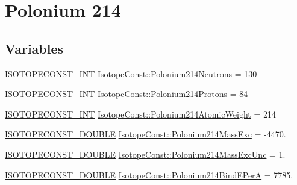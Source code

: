 \hypertarget{group___isotope_const-_polonium-_po214}{}\section{Polonium 214}
\label{group___isotope_const-_polonium-_po214}
\subsection*{Variables}
\begin{DoxyCompactItemize}
\item 
\mbox{\hyperlink{group___isotope_const-_macros_ga5f18360b3e99483a35c32d789e62621c}{I\+S\+O\+T\+O\+P\+E\+C\+O\+N\+S\+T\+\_\+\+I\+NT}} \mbox{\hyperlink{group___isotope_const-_polonium-_po214_ga50bfaf605987fdd560646bcad4c8de04}{Isotope\+Const\+::\+Polonium214\+Neutrons}} = 130
\item 
\mbox{\hyperlink{group___isotope_const-_macros_ga5f18360b3e99483a35c32d789e62621c}{I\+S\+O\+T\+O\+P\+E\+C\+O\+N\+S\+T\+\_\+\+I\+NT}} \mbox{\hyperlink{group___isotope_const-_polonium-_po214_ga3c983859eb45c649ed7a60fcacbdc90e}{Isotope\+Const\+::\+Polonium214\+Protons}} = 84
\item 
\mbox{\hyperlink{group___isotope_const-_macros_ga5f18360b3e99483a35c32d789e62621c}{I\+S\+O\+T\+O\+P\+E\+C\+O\+N\+S\+T\+\_\+\+I\+NT}} \mbox{\hyperlink{group___isotope_const-_polonium-_po214_ga87a5aef139099f50a2465e36c62d27d1}{Isotope\+Const\+::\+Polonium214\+Atomic\+Weight}} = 214
\item 
\mbox{\hyperlink{group___isotope_const-_macros_ga8f45a7272ce02c0b4c65c44636ed719a}{I\+S\+O\+T\+O\+P\+E\+C\+O\+N\+S\+T\+\_\+\+D\+O\+U\+B\+LE}} \mbox{\hyperlink{group___isotope_const-_polonium-_po214_ga891eb170e9c56c8b2a89379927aa3326}{Isotope\+Const\+::\+Polonium214\+Mass\+Exc}} = -\/4470.
\item 
\mbox{\hyperlink{group___isotope_const-_macros_ga8f45a7272ce02c0b4c65c44636ed719a}{I\+S\+O\+T\+O\+P\+E\+C\+O\+N\+S\+T\+\_\+\+D\+O\+U\+B\+LE}} \mbox{\hyperlink{group___isotope_const-_polonium-_po214_ga7b2d7571d1a70217020977dd2dd9b252}{Isotope\+Const\+::\+Polonium214\+Mass\+Exc\+Unc}} = 1.
\item 
\mbox{\hyperlink{group___isotope_const-_macros_ga8f45a7272ce02c0b4c65c44636ed719a}{I\+S\+O\+T\+O\+P\+E\+C\+O\+N\+S\+T\+\_\+\+D\+O\+U\+B\+LE}} \mbox{\hyperlink{group___isotope_const-_polonium-_po214_ga2cd1db8450dedf6d4f200f30eec6cc7a}{Isotope\+Const\+::\+Polonium214\+Bind\+E\+PerA}} = 7785.
\item 

\end{DoxyCompactItemize}
